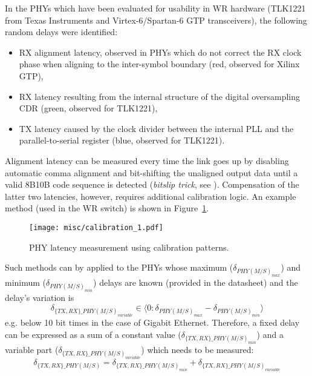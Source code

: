 In the PHYs which have been evaluated for usability in WR hardware (TLK1221
from Texas Instruments and Virtex-6/Spartan-6 GTP transceivers), the following
random delays were identified:
\begin{itemize}
\item RX alignment latency, observed in PHYs which do not correct the RX
clock phase when aligning to the inter-symbol boundary (red, observed for
Xilinx GTP),
\item RX latency resulting from the internal structure of the digital
oversampling CDR (green, observed for TLK1221),
\item TX latency caused by the clock divider between the internal PLL and
the parallel-to-serial register (blue, observed for TLK1221).
\end{itemize}
Alignment latency can be measured every time the link goes up by disabling
automatic comma alignment and bit-shifting the unaligned output data
until a valid 8B10B code sequence is detected (\textit{bitslip trick},
see \cite{Peek2010}). Compensation of the latter two latencies, however,
requires additional calibration logic. An example method (used in the WR
switch) is shown in Figure~\ref{fig:phy_latency_measurement}.
\begin{figure}[ht!]
  \centering
	\texttt{[image: misc/calibration\_1.pdf]}
  \caption{PHY latency measurement using calibration patterns.}
  \label{fig:phy_latency_measurement}
\end{figure}
Such methods can by applied to the
PHYs whose maximum ($\delta_{PHY(M/S)_{max}}$) and minimum ($\delta_{PHY(M/S)_{min}}$) delays are known 
(provided in the datasheet) and the delay's variation is
\begin{equation}
  \label{eq:fixedDelayVariation}
  \delta_{\{TX, RX\}\_PHY(M/S)_{variable}} \in \langle 0 :\delta_{PHY(M/S)_{max}} - \delta_{PHY(M/S)_{min}} \rangle
\end{equation}
e.g. below 10 bit times in the case of Gigabit Ethernet. 
Therefore, a fixed delay can be expressed as a sum of a constant value 
($\delta_{\{TX, RX\}\_PHY(M/S)_{min}}$) and a variable part ($\delta_{\{TX, RX\}\_PHY(M/S)_{variable}}$) which needs to be measured:
\begin{equation}
  \label{eq:fixedDelay}
  \delta_{\{TX, RX\}\_PHY(M/S)} = \delta_{\{TX, RX\}\_PHY(M/S)_{min}} + \delta_{\{TX, RX\}\_PHY(M/S)_{variable}}
\end{equation}
 


